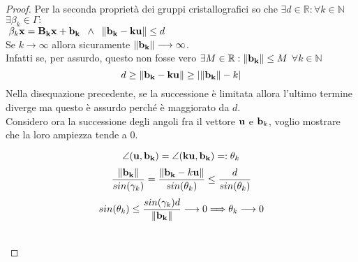 \documentclass[10pt,a4paper]{article}
\begin{document}
\begin{proof}
Per la seconda proprietà dei gruppi cristallografici so che $ \exists d \in \mathbb{R} : \forall k \in \mathbb{N} $ $  \exists \beta_k \in \Gamma : $ \\
$ \; \beta_k \vb{x} = \vb{B_k x + b_k}  \; \; \land \; \;\norm{\vb{b_k - ku }} \leq d $ 
\\
Se $k \longrightarrow \infty$ allora sicuramente $ \norm{\vb{b_k}} \longrightarrow \infty$.  \\
Infatti se, per assurdo, questo non fosse vero $\exists M \in \mathbb{R} : \norm{\vb{b_k}} \leq M $   $  \forall k \in \mathbb{N} $
\[ d \geq \norm{\vb{b_k - ku}} \geq | \norm{\vb{b_k}} - k | \]
Nella disequazione  precedente, se la successione è limitata allora l'ultimo termine diverge ma questo è assurdo perché è maggiorato da $d$. \\



Considero ora la successione degli angoli fra il vettore $\vb{u}$ e $\vb{b}_k$, voglio mostrare che la loro ampiezza tende a 0. 
\begin{minipage}{0.5\textwidth}
\end{minipage}\hfill
\begin{minipage}{0.5\textwidth}
	\[ \angle (\vb{u , b_k}) = \angle (\vb{ku, b_k}) = : \theta_k \]
\[ \frac{\norm{\vb{b_k}}}{sin(\gamma_k)} = \frac{\norm{\vb{b_k} - k\vb{u}}}{sin(\theta_k)}  \leq \frac{d}{sin(\theta_k)} \]
\[  sin(\theta_k) \leq \frac{sin(\gamma_k)d}{\norm{\vb{b_k}}} \longrightarrow 0 \Longrightarrow \theta_k \longrightarrow 0 \]
\end{minipage}\\



\end{proof}
\end{document}
